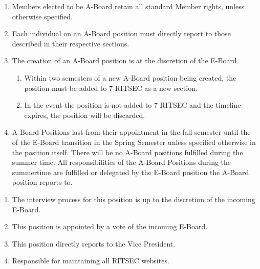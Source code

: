 

\begin{enumerate}
      \item Members elected to be A-Board retain all standard Member rights, unless
            otherwise specified.
      \item Each individual on an A-Board position must directly report to those described
            in their respective sections.
      \item The creation of an A-Board position is at the discretion of the E-Board.
            \begin{enumerate}
                  \item Within two semesters of a new A-Board position being created, the position must
                        be added to 7 RITSEC as a new section.
                  \item In the event the position is not added to 7 RITSEC and the timeline expires,
                        the position will be discarded.
            \end{enumerate}
      \item A-Board Positions last from their appointment in the fall semester until the of the E-Board transition in the Spring Semester unless specified otherwise in the position itself. There will be no A-Board positions fulfilled during the summer time. All responsibilities of the A-Board Positions during the summertime are fulfilled or delegated by the E-Board position the A-Board position reports to.

\end{enumerate}


\begin{enumerate}
      \item The interview process for this position is up to the discretion of the incoming
            E-Board.
      \item This position is appointed by a vote of the incoming E-Board.
      \item This position directly reports to the Vice President.
      \item Responsible for maintaining all RITSEC websites.
\end{enumerate}

